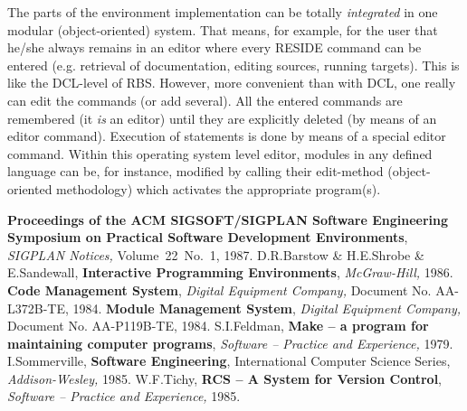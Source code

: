 The parts of the environment implementation can be totally {\em integrated}\/ in
one modular (object-oriented) system. That means, for example, for the user 
that he/she always remains in an editor where every RESIDE command can be 
entered (e.g. retrieval of documentation, editing sources, running targets). 
This is like the DCL-level of RBS. 
However, more convenient than with DCL, one really can edit the commands (or 
add several). All the entered commands are remembered (it {\em is}\/ an editor) 
until they are explicitly deleted (by means of an editor command). Execution of 
statements is done by means of a special editor command. Within this operating 
system level editor, modules in any defined language can be, for instance, 
modified by calling their edit-method (object-oriented methodology) which 
activates the appropriate program(s).

\begin{thebibliography}{MMM99m}
  {\bf Proceedings of the ACM SIGSOFT/SIGPLAN Software 
  Engineering Symposium on Practical Software Development Environments}, {\em 
  SIGPLAN Notices,}\/ Volume~22~No.~1, 1987.
  D.R.Barstow \& H.E.Shrobe \& E.Sandewall, 
  {\bf Interactive Programming Environments}, {\em McGraw-Hill,}\/ 1986.
  {\bf Code Management System}, {\em Digital 
  Equipment Company,}\/ Document No. AA-L372B-TE, 1984.
  {\bf Module Management System}, {\em Digital 
  Equipment Company,}\/ Document No. AA-P119B-TE, 1984.
  S.I.Feldman, {\bf Make -- a program for maintaining 
  computer programs}, {\em Software -- Practice and Experience,}\/ 1979.
  I.Sommerville, {\bf Software Engineering}, 
  International Computer Science Series, {\em Addison-Wesley,}\/ 1985.
  W.F.Tichy, {\bf RCS -- A System for Version Control},
  {\em Software -- Practice and Experience,}\/ 1985.
\end{thebibliography}


